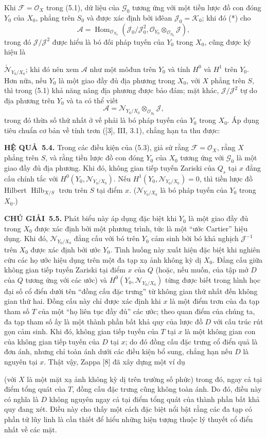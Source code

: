 \documentclass[11pt,twoside,openany]{book}
\numberwithin{equation}{section}
\newcommand{\src}[1]{%
  \phantomsection\hypertarget{src:\fgasourceid:#1}{}%
  \marginpar{\raggedleft\footnotesize\sffamily #1}%
}
\newcommand{\fgasourceid}{unset}
\newcommand{\result}[2]{\par\medskip\noindent\textbf{#1\if\relax\detokenize{#2}\relax\else\ #2\fi.}\quad}
\begin{document}
Khi $\mathcal F=\mathcal O_X$ trong (5.1), dữ liệu của
$\mathcal G_0$ tương ứng với một tiền lược đồ con đóng $Y_0$ của
$X_0$, phẳng trên $S_0$ và được xác định bởi iđêan
$\mathcal J_0=\mathcal K_0$; khi đó (*) cho
\[
\mathcal A=\operatorname{Hom}_{\mathcal O_{X_0}}
(\mathcal J_0/\mathcal J_0^2,
\mathcal O_{Y_0}\otimes_{\mathcal O_{S_0}}\mathcal J),
\]
trong đó $\mathcal J/\mathcal J^2$ được hiểu là bó đối pháp tuyến của $Y_0$
trong $X_0$, cũng được ký hiệu là
\src{271}
$\check{\mathcal N}_{Y_0/X_0}$; khi đó nên xem $\mathcal A$ như một môđun
trên $Y_0$ và tính $H^0$ và $H^1$ trên $Y_0$. Hơn nữa, nếu $Y_0$ là một giao
đầy đủ địa phương trong $X_0$, với $X$ phẳng trên $S$, thì trong (5.1) khả
năng nâng địa phương được bảo đảm; mặt khác,
$\mathcal J/\mathcal J^2$ tự do địa phương trên $Y_0$ và ta có thể viết
\[
\mathcal A=\mathcal N_{Y_0/X_0}\otimes_{\mathcal O_{S_0}}\mathcal J,
\]
trong đó thừa số thứ nhất ở vế phải là bó pháp tuyến của $Y_0$ trong $X_0$.
Áp dụng tiêu chuẩn cơ bản về tính trơn ([3], III, 3.1), chẳng hạn ta thu được:

\result{HỆ QUẢ}{5.4} Trong các điều kiện của (5.3), giả sử rằng
$\mathcal F=\mathcal O_X$, rằng $X$ phẳng trên $S$, và rằng tiền lược đồ con
đóng $Y_0$ của $X_0$ tương ứng với $\mathcal G_0$ là một giao đầy đủ địa
phương. Khi đó, không gian tiếp tuyến Zariski của $Q_s$ tại $x$ đẳng cấu chính
tắc với $H^0(Y_0,\mathcal N_{Y_0/X_0})$. Nếu
$H^1(Y_0,\mathcal N_{Y_0/X_0})=0$, thì tiền lược đồ Hilbert
$\operatorname{Hilb}_{X/S}$ trơn trên $S$ tại điểm $x$.
($\mathcal N_{Y_0/X_0}$ là bó pháp tuyến của $Y_0$ trong $X_0$.)

\result{CHÚ GIẢI}{5.5} Phát biểu này áp dụng đặc biệt khi $Y_0$ là một giao
đầy đủ trong $X_0$ được xác định bởi một phương trình, tức là một ``ước
Cartier'' hiệu dụng. Khi đó, $\mathcal N_{Y_0/X_0}$ đẳng cấu với bó trên $Y_0$
cảm sinh bởi bó khả nghịch $\mathcal J^{-1}$ trên $X_0$ được xác định bởi
ước $Y_0$. Tình huống này xuất hiện đặc biệt khi nghiên cứu các họ ước hiệu
dụng trên một đa tạp xạ ảnh không kỳ dị $X_0$. Đẳng cấu giữa không gian tiếp
tuyến Zariski tại điểm $x$ của $Q$ (hoặc, nếu muốn, của tập mở $D$ của $Q$
tương ứng với các ước) và $H^0(Y_0,\mathcal N_{Y_0/X_0})$ từng được biết trong
hình học đại số cổ điển dưới tên ``đồng cấu đặc trưng'' từ không gian thứ nhất
đến không gian thứ hai. Đồng cấu này chỉ được xác định khi $x$ là một điểm trơn
của đa tạp tham số $T$ của một ``họ liên tục đầy đủ'' các ước; theo quan điểm
của chúng ta, đa tạp tham số ấy là một thành phần bất khả quy của lược đồ $D$
với cấu trúc rút gọn cảm sinh. Khi đó, không gian tiếp tuyến của $T$ tại $x$ là
một không gian con của không gian tiếp tuyến của $D$ tại $x$; do đó đồng cấu
đặc trưng cổ điển quả là đơn ánh, nhưng chỉ toàn ánh dưới các điều kiện bổ
sung, chẳng hạn nếu $D$ là nguyên tại $x$. Thật vậy, Zappa [8] đã xây dựng
một ví dụ
\src{272}
(với $X$ là một mặt xạ ảnh không kỳ dị trên trường số phức) trong đó, ngay cả
tại điểm tổng quát của $T$, đồng cấu đặc trưng cũng không toàn ánh. Do đó, điều
này có nghĩa là $D$ không nguyên ngay cả tại điểm tổng quát của thành phần bất
khả quy đang xét. Điều này cho thấy một cách đặc biệt nổi bật rằng các đa tạp
có phần tử lũy linh là cần thiết để hiểu những hiện tượng thuộc lý thuyết cổ
điển nhất về các mặt.
\end{document}
